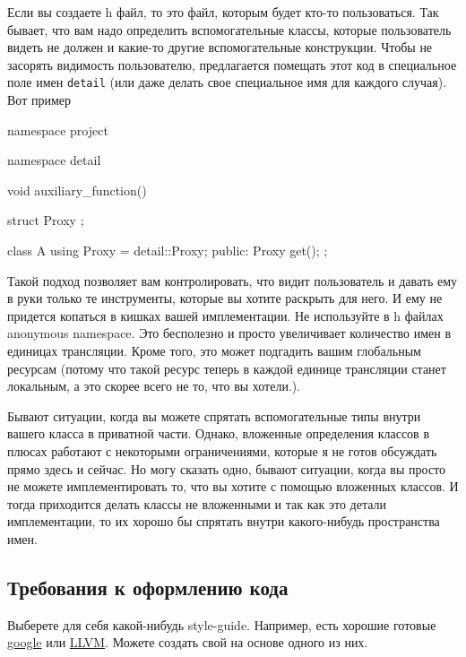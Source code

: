\documentclass{article}
\begin{document}
Если вы создаете h файл, то это файл, которым будет кто-то пользоваться. Так бывает, что вам надо определить вспомогательные классы, которые пользователь видеть не должен и какие-то другие вспомогательные конструкции. Чтобы не засорять видимость пользователю, предлагается помещать этот код в специальное поле имен \verb"detail" (или даже делать свое специальное имя для каждого случая). Вот пример
\begin{cppcode}
namespace project {
namespace detail {
void auxiliary_function() {}

struct Proxy {};
}

class A {
  using Proxy = detail::Proxy;
public:
  Proxy get();
};
}
\end{cppcode}
Такой подход позволяет вам контролировать, что видит пользователь и давать ему в руки только те инструменты, которые вы хотите раскрыть для него. И ему не придется копаться в кишках вашей имплементации. Не используйте в h файлах anonymous namespace. Это бесполезно и просто увеличивает количество имен в единицах трансляции. Кроме того, это может подгадить вашим глобальным ресурсам (потому что такой ресурс теперь в каждой единице трансляции станет локальным, а это скорее всего не то, что вы хотели.).

Бывают ситуации, когда вы можете спрятать вспомогательные типы внутри вашего класса в приватной части. Однако, вложенные определения классов в плюсах работают с некоторыми ограничениями, которые я не готов обсуждать прямо здесь и сейчас. Но могу сказать одно, бывают ситуации, когда вы просто не можете имплементировать то, что вы хотите с помощью вложенных классов. И тогда приходится делать классы не вложенными и так как это детали имплементации, то их хорошо бы спрятать внутри какого-нибудь пространства имен.


\subsection{Требования к оформлению кода}

Выберете для себя какой-нибудь style-guide. Например, есть хорошие готовые \href{https://google.github.io/styleguide/cppguide.html}{google} или \href{https://llvm.org/docs/CodingStandards.html}{LLVM}. Можете создать свой на основе одного из них.
\end{document}
